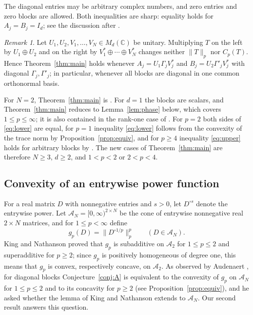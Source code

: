 \documentclass[11pt]{amsart}
\theoremstyle{definition}
\theoremstyle{remark}
\newtheorem{remark}[theorem]{Remark}
\numberwithin{equation}{section}
\newcommand{\C}{\mathbb{C}}
\newcommand{\cA}{\mathcal{A}}
\begin{document}
The diagonal entries may be arbitrary complex numbers, and zero entries and zero blocks are allowed. Both inequalities are sharp: equality holds for $A_j=B_j=I_d$; see the discussion after \cite[Conjecture~1.14]{Zha26}.

\begin{remark}\label{rem:bases}
Let $U_1,U_2,V_1,\dots,V_N\in M_d(\C)$ be unitary. Multiplying $T$ on the left by $U_1\oplus U_2$ and on the right by $V_1^*\oplus\cdots\oplus V_N^*$ changes neither $\|T\|_p$ nor $C_p(T)$. Hence Theorem~\ref{thm:main} holds whenever $A_j=U_1\Gamma_jV_j^*$ and $B_j=U_2\Gamma'_jV_j^*$ with diagonal $\Gamma_j,\Gamma'_j$; in particular, whenever all blocks are diagonal in one common orthonormal basis.
\end{remark}

For $N=2$, Theorem~\ref{thm:main} is \cite[Theorem~1]{KN04}. For $d=1$ the blocks are scalars, and Theorem~\ref{thm:main} reduces to Lemma~\ref{lem:phase} below, which covers $1\le p\le\infty$; it is also contained in the rank-one case of \cite[Section~4.2]{Aud08}. For $p=2$ both sides of \eqref{eq:lower} are equal, for $p=1$ inequality \eqref{eq:lower} follows from the convexity of the trace norm by Proposition~\ref{prop:equiv}, and for $p\ge4$ inequality \eqref{eq:upper} holds for arbitrary blocks by \cite[Section~4.4]{Aud08}. The new cases of Theorem~\ref{thm:main} are therefore $N\ge3$, $d\ge2$, and $1<p<2$ or $2<p<4$.

\subsection*{Convexity of an entrywise power function}
For a real matrix $D$ with nonnegative entries and $s>0$, let $D^{\circ s}$ denote the entrywise power. Let $\cA_N=[0,\infty)^{2\times N}$ be the cone of entrywise nonnegative real $2\times N$ matrices, and for $1\le p<\infty$ define
\begin{equation}\label{eq:gp}
g_p(D)=\|D^{\circ1/p}\|_p^p\qquad(D\in\cA_N).
\end{equation}
King and Nathanson \cite[Lemma~3]{KN04} proved that $g_p$ is subadditive on $\cA_2$ for $1\le p\le2$ and superadditive for $p\ge2$; since $g_p$ is positively homogeneous of degree one, this means that $g_p$ is convex, respectively concave, on $\cA_2$. As observed by Audenaert \cite[Section~5]{Aud08}, for diagonal blocks Conjecture~\ref{conj:A} is equivalent to the convexity of $g_p$ on $\cA_N$ for $1\le p\le2$ and to its concavity for $p\ge2$ (see Proposition~\ref{prop:equiv}), and he asked whether the lemma of King and Nathanson extends to $\cA_N$. Our second result answers this question.
\end{document}
